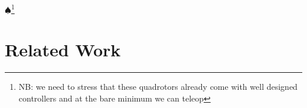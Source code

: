 \documentclass[letterpaper, 10 pt, conference]{ieeeconf}  %
\newcommand\NB[1]{$\spadesuit$\footnote{NB: #1}}
\begin{document}
\NB{we need to stress that these quadrotors already come with well designed controllers and at the bare minimum we can teleop }


\section{Related Work}
\end{document}
